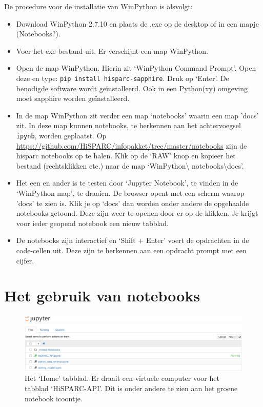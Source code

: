 De procedure voor de installatie van WinPython is alsvolgt:
\begin{itemize}
\item Download WinPython 2.7.10 en plaats de .exe op de desktop of in een mapje (Notebooks?).
\item Voer het exe-bestand uit. Er verschijnt een map WinPython.
\item Open de map WinPython. Hierin zit `WinPython Command Prompt'. Open deze en type:
 {\tt pip install hisparc-sapphire}. Druk op `Enter'. De benodigde \hisparc software wordt ge\"{i}nstalleerd.
 Ook in een Python(xy) omgeving moet sapphire worden ge\"{i}nstalleerd.
\item In de map WinPython zit verder een map `notebooks' waarin een map 'docs' zit. In deze map kunnen notebooks,
te herkennen aan het achtervoegsel {\tt ipynb}, worden geplaatst.
Op \url{https://github.com/HiSPARC/infopakket/tree/master/notebooks} zijn de hisparc notebooks op te halen. Klik
op de `RAW' knop en kopieer het bestand (rechtsklikken etc.) naar de map `WinPython\textbackslash
notebooks\textbackslash docs'.
\item Het een en ander is te testen door `Jupyter Notebook', te vinden in de `WinPython map', te draaien. De browser
opent met een scherm waarop 'docs' te zien is. Klik je op `docs' dan worden onder andere de opgehaalde notebooks
getoond. Deze zijn weer te openen door er op de klikken. Je krijgt voor ieder geopend notebook een nieuw tabblad.
\item De notebooks zijn interactief en `Shift + Enter' voert de opdrachten in de code-cellen uit. Deze zijn te herkennen aan
een opdracht prompt met een cijfer.
\end{itemize}

\section{Het gebruik van notebooks}

\begin{figure}[H]
\includegraphics[width=16cm]{home.png}
\caption{Het `Home' tabblad. Er draait een virtuele computer voor het tabblad `HiSPARC-API'. Dit is onder andere te zien
aan het groene notebook icoontje.}
\end{figure}

